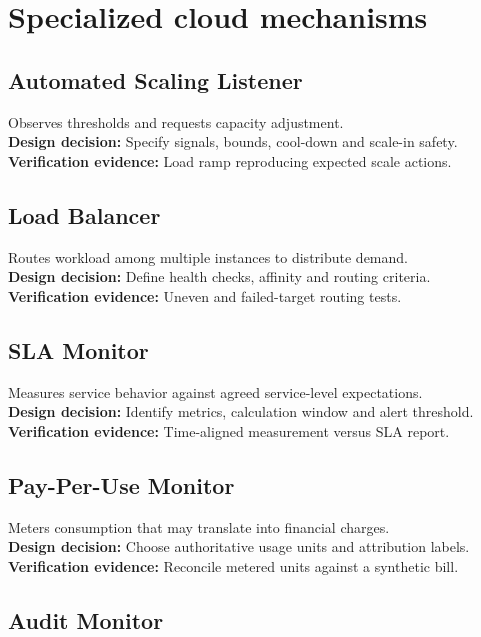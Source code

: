 \documentclass[10pt,letterpaper]{article}
\begin{document}
\section{Specialized cloud mechanisms}
\subsection{Automated Scaling Listener}
Observes thresholds and requests capacity adjustment.\\[4pt]
\textbf{Design decision:} Specify signals, bounds, cool-down and scale-in safety.\\[3pt]
\textbf{Verification evidence:} Load ramp reproducing expected scale actions.\\[3pt]
\subsection{Load Balancer}
Routes workload among multiple instances to distribute demand.\\[4pt]
\textbf{Design decision:} Define health checks, affinity and routing criteria.\\[3pt]
\textbf{Verification evidence:} Uneven and failed-target routing tests.\\[3pt]
\subsection{SLA Monitor}
Measures service behavior against agreed service-level expectations.\\[4pt]
\textbf{Design decision:} Identify metrics, calculation window and alert threshold.\\[3pt]
\textbf{Verification evidence:} Time-aligned measurement versus SLA report.\\[3pt]
\subsection{Pay-Per-Use Monitor}
Meters consumption that may translate into financial charges.\\[4pt]
\textbf{Design decision:} Choose authoritative usage units and attribution labels.\\[3pt]
\textbf{Verification evidence:} Reconcile metered units against a synthetic bill.\\[3pt]
\subsection{Audit Monitor}
\end{document}
